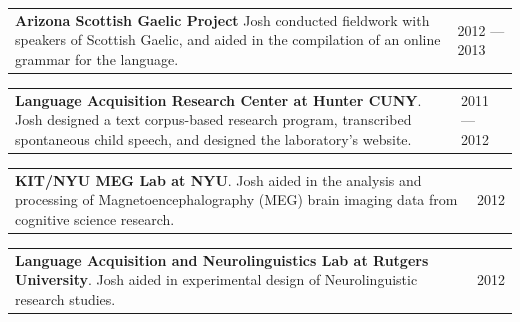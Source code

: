 \documentclass{resume} %
\begin{document}
\begin{tabular}{@{}p{}p{}@{}}
  {\bf Arizona Scottish Gaelic Project}
  Josh conducted fieldwork with speakers of Scottish Gaelic, and aided in the compilation of an online grammar for the language.
  &
\hfill  {2012 --- 2013}
\end{tabular}


\begin{tabular}{@{}p{}p{}@{}}
  {\bf Language Acquisition Research Center at Hunter CUNY}.
  Josh designed a text corpus-based research program, transcribed spontaneous child speech, and designed the laboratory's website.
  &
\hfill  {2011 --- 2012}
\end{tabular}

\begin{tabular}{@{}p{}p{}@{}}
  {\bf KIT/NYU MEG Lab at NYU}.
  Josh aided in the analysis and processing of Magnetoencephalography (MEG) brain imaging data from cognitive science research.
  &
\hfill {2012}
\end{tabular}


\begin{tabular}{@{}p{}p{}@{}}
  {\bf Language Acquisition and Neurolinguistics Lab at Rutgers University}.
  Josh aided in experimental design of Neurolinguistic research studies.
  &
\hfill {2012}
\end{tabular}






\vspace{0.5cm}
\end{document}
